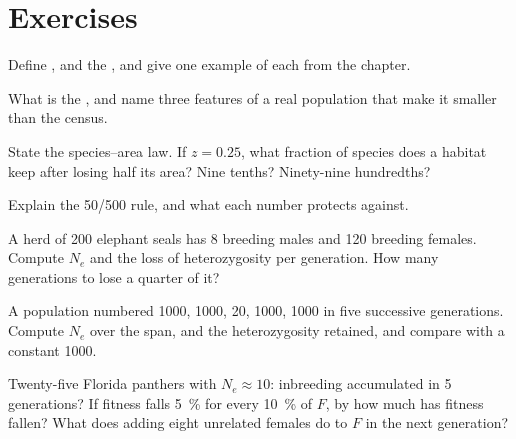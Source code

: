 \section{Exercises}

\begin{exercise}[$\star$]\label{exo:b3:conservation-biology:1}
Define ,  and the
, and give one example of each from the chapter.
\end{exercise}

\begin{exercise}[$\star$]\label{exo:b3:conservation-biology:2}
What is the , and name three features of a
real population that make it smaller than the census.
\end{exercise}

\begin{exercise}[$\star$]\label{exo:b3:conservation-biology:3}
State the species--area law. If $z = 0.25$, what fraction of species
does a habitat keep after losing half its area? Nine tenths? Ninety-nine
hundredths?
\end{exercise}

\begin{exercise}[$\star$]\label{exo:b3:conservation-biology:4}
Explain the 50/500 rule, and what each number protects against.
\end{exercise}

\begin{exercise}[$\star\star$]\label{exo:b3:conservation-biology:5}
A herd of 200 elephant seals has 8 breeding males and 120 breeding
females. Compute $N_{e}$ and the loss of heterozygosity per generation.
How many generations to lose a quarter of it?
\end{exercise}

\begin{exercise}[$\star\star$]\label{exo:b3:conservation-biology:6}
A population numbered 1000, 1000, 20, 1000, 1000 in five successive
generations. Compute $N_{e}$ over the span, and the heterozygosity
retained, and compare with a constant 1000.
\end{exercise}

\begin{exercise}[$\star\star$]\label{exo:b3:conservation-biology:7}
Twenty-five Florida panthers with $N_{e} \approx 10$: inbreeding
accumulated in 5 generations? If fitness falls \qty{5}{\%} for every
\qty{10}{\%} of $F$, by how much has fitness fallen? What does adding
eight unrelated females do to $F$ in the next generation?
\end{exercise}

